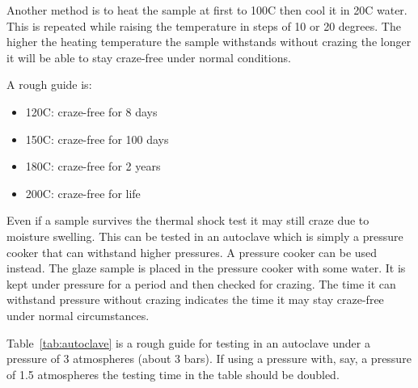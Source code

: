 Another method is to heat the sample at first to 100\degree C then cool it in 
20\degree C water. This is repeated while raising the temperature in steps of 
10 or 20 degrees. The higher the heating temperature the sample withstands 
without crazing the longer it will be able to stay craze-free under normal 
conditions.

A rough guide is:
\begin{itemize}
\item 120\degree C: craze-free for 8 days
\item 150\degree C: craze-free for 100 days
\item 180\degree C: craze-free for 2 years
\item 200\degree C: craze-free for life
\end{itemize}
Even if a sample survives the thermal shock test it may still craze due to 
moisture swelling. This can be tested in an autoclave which is simply a 
pressure cooker that can withstand higher pressures. A pressure cooker can be 
used instead. The glaze sample is placed in the pressure cooker with some 
water. It is kept under pressure for a period and then checked for crazing. The 
time it can withstand pressure without crazing indicates the time it may stay 
craze-free under normal circumstances. 

Table~\ref{tab:autoclave} is a rough guide for testing in an autoclave under a 
pressure of 3 atmospheres (about 3 bars). If using a pressure with, say, a 
pressure of 1.5 atmospheres the testing time in the table should be doubled.

